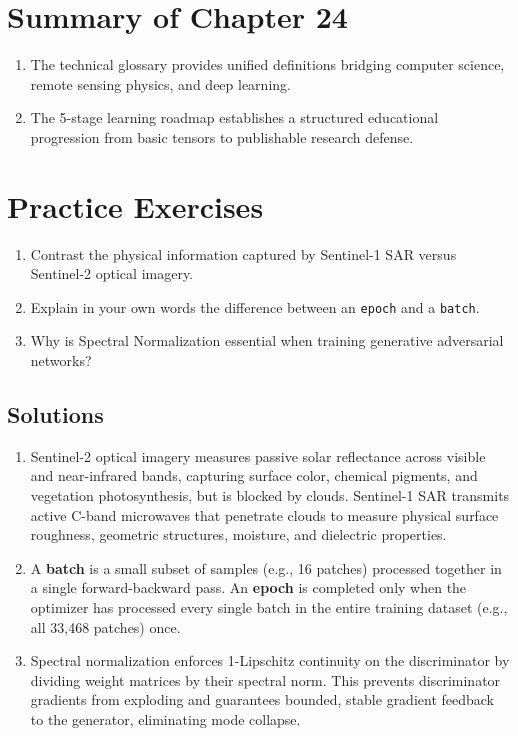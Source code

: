 \section{Summary of Chapter 24}
\begin{enumerate}
    \item The technical glossary provides unified definitions bridging computer science, remote sensing physics, and deep learning.
    \item The 5-stage learning roadmap establishes a structured educational progression from basic tensors to publishable research defense.
\end{enumerate}

\section{Practice Exercises}
\begin{enumerate}
    \item Contrast the physical information captured by Sentinel-1 SAR versus Sentinel-2 optical imagery.
    \item Explain in your own words the difference between an \texttt{epoch} and a \texttt{batch}.
    \item Why is Spectral Normalization essential when training generative adversarial networks?
\end{enumerate}

\subsection*{Solutions}
\begin{enumerate}
    \item Sentinel-2 optical imagery measures passive solar reflectance across visible and near-infrared bands, capturing surface color, chemical pigments, and vegetation photosynthesis, but is blocked by clouds. Sentinel-1 SAR transmits active C-band microwaves that penetrate clouds to measure physical surface roughness, geometric structures, moisture, and dielectric properties.
    \item A \textbf{batch} is a small subset of samples (e.g., 16 patches) processed together in a single forward-backward pass. An \textbf{epoch} is completed only when the optimizer has processed every single batch in the entire training dataset (e.g., all 33,468 patches) once.
    \item Spectral normalization enforces 1-Lipschitz continuity on the discriminator by dividing weight matrices by their spectral norm. This prevents discriminator gradients from exploding and guarantees bounded, stable gradient feedback to the generator, eliminating mode collapse.
\end{enumerate}
